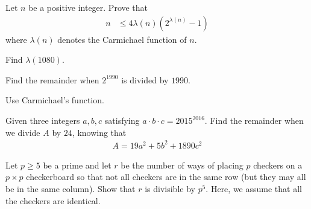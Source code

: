 \documentclass{subfile}
\begin{document}

	\begin{problem} %
		Let $n$ be a positive integer. Prove that
		\begin{align*}
			n
				& \le 4\lambda(n)\left(2^{\lambda(n)}-1\right)
		\end{align*}
		where $\lambda(n)$ denotes the Carmichael function of $n$.
	\end{problem}

	\begin{problem}
		Find $\lambda(1080)$.
	\end{problem}

	\begin{problem}[RMO 1990]%
		Find the remainder when $2^{1990}$ is divided by $1990$.
	\end{problem}

	\begin{hint}
		Use Carmichael's function.
	\end{hint}

	\begin{problem} %
		Given three integers $a,b,c$ satisfying $a\cdot b\cdot c=2015^{2016}$. Find the remainder when we divide $A$ by $24$, knowing that
		\begin{align*}
		A=19a^2+5b^2+1890c^2
		\end{align*}
	\end{problem}

	\begin{problem}[APMO 2006] %
		Let $p\ge5$ be a prime and let $r$ be the number of ways of placing $p$ checkers on a $p\times p$ checkerboard so that not all checkers are in the same row (but they may all be in the same column). Show that $r$ is divisible by $p^5$. Here, we assume that all the checkers are identical.
	\end{problem}
\end{document}
